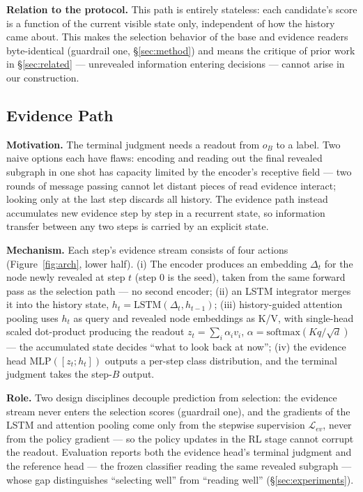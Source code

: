 \documentclass{article}
\begin{document}
\textbf{Relation to the protocol.} This path is entirely stateless: each candidate's score is a function of the current visible state only, independent of how the history came about. This makes the selection behavior of the base and evidence readers byte-identical (guardrail one, \S\ref{sec:method}) and means the critique of prior work in \S\ref{sec:related} --- unrevealed information entering decisions --- cannot arise in our construction.

\subsection{Evidence Path}
\label{subsec:evidence}

\textbf{Motivation.} The terminal judgment needs a readout from $o_B$ to a label. Two naive options each have flaws: encoding and reading out the final revealed subgraph in one shot has capacity limited by the encoder's receptive field --- two rounds of message passing cannot let distant pieces of read evidence interact; looking only at the last step discards all history. The evidence path instead accumulates new evidence step by step in a recurrent state, so information transfer between any two steps is carried by an explicit state.

\textbf{Mechanism.} Each step's evidence stream consists of four actions (Figure~\ref{fig:arch}, lower half). (i) The encoder produces an embedding $\Delta_t$ for the node newly revealed at step $t$ (step 0 is the seed), taken from the same forward pass as the selection path --- no second encoder; (ii) an LSTM integrator merges it into the history state, $h_t=\mathrm{LSTM}(\Delta_t,h_{t-1})$; (iii) history-guided attention pooling uses $h_t$ as query and revealed node embeddings as K/V, with single-head scaled dot-product producing the readout $z_t=\sum_i\alpha_i v_i$, $\alpha=\mathrm{softmax}(Kq/\sqrt d)$ --- the accumulated state decides ``what to look back at now''; (iv) the evidence head $\mathrm{MLP}([z_t;h_t])$ outputs a per-step class distribution, and the terminal judgment takes the step-$B$ output.

\textbf{Role.} Two design disciplines decouple prediction from selection: the evidence stream never enters the selection scores (guardrail one), and the gradients of the LSTM and attention pooling come only from the stepwise supervision $\mathcal L_{ev}$, never from the policy gradient --- so the policy updates in the RL stage cannot corrupt the readout. Evaluation reports both the evidence head's terminal judgment and the reference head --- the frozen classifier reading the same revealed subgraph --- whose gap distinguishes ``selecting well'' from ``reading well'' (\S\ref{sec:experiments}).
\end{document}
